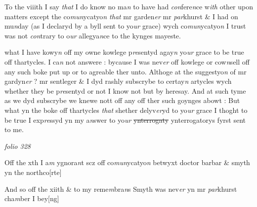 \documentclass[12pt, a4paper]{book}
\begin{document}
				\marginpar[\vspace{0.5cm}{\textcolor{Gray}{8}}]{}
			
		\ifthenelse{\isodd{\thepage}}
		{\reversemarginpar}
		{\normalmarginpar}
		To the viiith I say \textit{that} I do know no ma\textit{n} to have had \textit{con}fere\textit{n}ce w\textit{ith} other upon matters
except the co\textit{mun}ycatyo\textit{n that} mr garden\textit{er} mr \textit{par}khurst \& I had on mu\textit{n}day (as I declaryd
by a byll sent to yo\textit{ur} grace) wych co\textit{mun}ycatyo\textit{n} I trust was not \textit{con}trary to 
o\textit{ur} allegya\textit{n}ce to the kynges mayeste.


				\marginpar[\vspace{0.5cm}{\textcolor{Gray}{9}}]{}
			
		\ifthenelse{\isodd{\thepage}}
		{\reversemarginpar}
		{\normalmarginpar}
		what I have kowy\textit{n} off my owne kowlege p\textit{re}sentyd agay\textit{n} yo\textit{ur} grace to be true
off thartycles. I ca\textit{n} not answere : bycause I was nev\textit{er} off kowlege or cow\textit{n}sell off 
any such boke put up or to agreable ther unto. Althoge at the suggestyo\textit{n} of mr
gardyn\textit{er} ? mr sentleger \& I dyd rashly subscrybe to certay\textit{n} artycles wych whether
they be p\textit{re}sentyd or not I know not but by heresay. And at such tyme as we dyd subscrybe we knewe nott off any off ther such goynges abowt : But what yn the
boke off thartycles \textit{that} shether delyv\textit{er}yd to yo\textit{ur} grace I thoght to be true I exp\textit{re}ssyd
yn my a\textit{n}swer to yo\textit{ur}
               \sout{ynterrogaty }ynterrogatorys fyrst sent to me.

\dotfill
						\newpage
{}

\textit{folio 328}


 	
				\marginpar[\vspace{0.5cm}{\textcolor{Gray}{10}}]{}
			
		\ifthenelse{\isodd{\thepage}}
		{\reversemarginpar}
		{\normalmarginpar}
		Off the xth I a\textit{m} ygnora\textit{n}t scz off co\textit{mun}ycatyo\textit{n} betwyxt doctor barbar \& smyth yn the northco[rte]
 	
				\marginpar[\vspace{0.5cm}{\textcolor{Gray}{12}}]{}
			
		\ifthenelse{\isodd{\thepage}}
		{\reversemarginpar}
		{\normalmarginpar}
		And so off the xiith \& to my reme\textit{m}bra\textit{n}s Smyth was nev\textit{er }yn mr \textit{par}khurst cha\textit{m}ber I bey[ng]
                     
\end{document}
